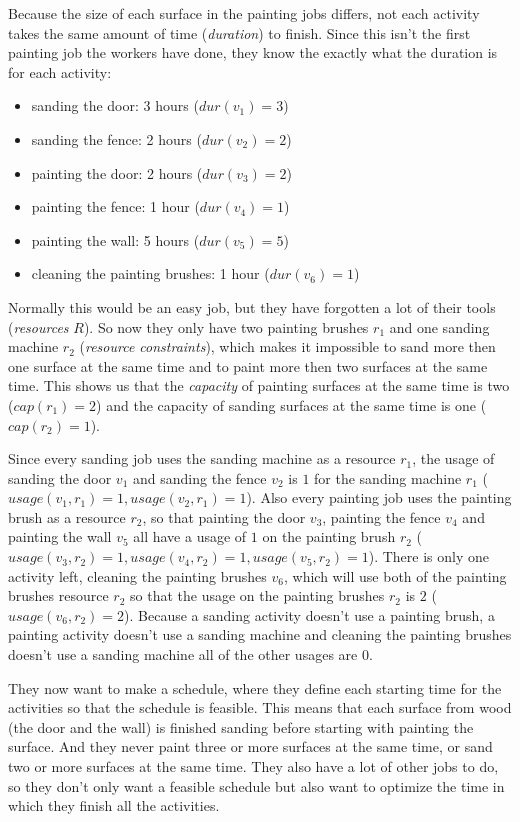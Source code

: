 \documentclass{article}
\newcommand{\capa}[1]{\ensuremath{cap(r_{#1})}} %
\newcommand{\dur}[1]{\ensuremath{dur(v_{#1})}} %
\newcommand{\usage}[2]{\ensuremath{usage(v_{#1}, r_{#2})}} %
\begin{document}
Because the size of each surface in the painting jobs differs, not each activity takes the same amount of time (\emph{duration}) to finish.
Since this isn't the first painting job the workers have done, they know the exactly what the duration is for each activity:
\begin{itemize}
\item sanding the door: 3 hours ($\dur{1} = 3$)
\item sanding the fence: 2 hours ($\dur{2} = 2$)
\item painting the door: 2 hours ($\dur{3} = 2$)
\item painting the fence: 1 hour ($\dur{4} = 1$)
\item painting the wall: 5 hours ($\dur{5} = 5$)
\item cleaning the painting brushes: 1 hour ($\dur{6} = 1$)
\end{itemize}
Normally this would be an easy job, but they have forgotten a lot of their tools (\emph{resources} $R$).
So now they only have two painting brushes $r_1$ and one sanding machine $r_2$ (\emph{resource constraints}), which makes it impossible to sand more then one surface at the same time and to paint more then two surfaces at the same time.
This shows us that the \emph{capacity} of painting surfaces at the same time is two ($\capa{1} = 2$) and the capacity of sanding surfaces at the same time is one  ($\capa{2} = 1$).

Since every sanding job uses the sanding machine as a resource $r_1$, the usage of sanding the door $v_1$ and sanding the fence $v_2$ is $1$ for the sanding machine $r_1$ ($\usage{1}{1} = 1, \usage{2}{1} = 1$).
Also every painting job uses the painting brush as a resource $r_2$, so that painting the door $v_3$, painting the fence $v_4$ and painting the wall $v_5$ all have a usage of $1$ on the painting brush $r_2$ ($\usage{3}{2} = 1, \usage{4}{2} = 1, \usage{5}{2} = 1$).
There is only one activity left, cleaning the painting brushes $v_6$, which will use both of the painting brushes resource $r_2$ so that the usage on the painting brushes $r_2$ is $2$ ($\usage{6}{2} = 2$).
Because a sanding activity doesn't use a painting brush, a painting activity doesn't use a sanding machine and cleaning the painting brushes doesn't use a sanding machine all of the other usages are $0$.

They now want to make a schedule, where they define each starting time for the activities so that the schedule is feasible.
This means that each surface from wood (the door and the wall) is finished sanding before starting with painting the surface.
And they never paint three or more surfaces at the same time, or sand two or more surfaces at the same time.
They also have a lot of other jobs to do, so they don't only want a feasible schedule but also want to optimize the time in which they finish all the activities.
\end{document}
